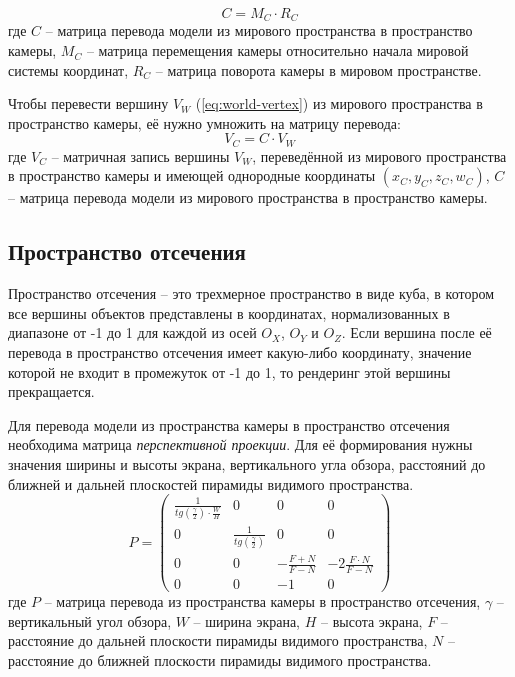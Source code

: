 \begin{equation}
	C = M_C \cdot R_C
\end{equation}
где $C$ -- матрица перевода модели из мирового пространства в пространство камеры, $M_C$ -- матрица перемещения камеры относительно начала мировой системы координат, $R_C$ -- матрица поворота камеры в мировом пространстве.

Чтобы перевести вершину $V_W$ (\ref{eq:world-vertex}) из мирового пространства в пространство камеры, её нужно умножить на матрицу перевода:
\begin{equation}
	V_C = C \cdot V_W
	\label{eq:camera-vertex}
\end{equation}
где $V_C$ -- матричная запись вершины $V_W$, переведённой из мирового пространства в пространство камеры и имеющей однородные координаты $(x_C, y_C, z_C, w_C)$, $C$ -- матрица перевода модели из мирового пространства в пространство камеры. 

\subsection{Пространство отсечения}

Пространство отсечения -- это трехмерное пространство в виде куба, в котором все вершины объектов представлены в координатах, нормализованных в диапазоне от -1 до 1 для каждой из осей $O_X$, $O_Y$ и $O_Z$. Если вершина после её перевода в пространство отсечения имеет какую-либо координату, значение которой не входит в промежуток от -1 до 1, то рендеринг этой вершины прекращается.

Для перевода модели из пространства камеры в пространство отсечения необходима матрица \textit{перспективной проекции}. Для её формирования нужны значения ширины и высоты экрана, вертикального угла обзора, расстояний до ближней и дальней плоскостей пирамиды видимого пространства.
\begin{equation}
	P = 
	\begin{pmatrix}
		\frac{1}{tg(\frac{\gamma}{2}) \cdot \frac{W}{H}} & 0 & 0 & 0 \\
		0 & \frac{1}{tg(\frac{\gamma}{2})} & 0 & 0 \\
		0 & 0 & -\frac{F + N}{F - N} & -2\frac{F \cdot N}{F - N} \\
		0 & 0 & -1 & 0 
	\end{pmatrix}
	\label{eq:clip-matrix}
\end{equation}
где $P$ -- матрица перевода из пространства камеры в пространство отсечения, $\gamma$ -- вертикальный угол обзора, $W$ -- ширина экрана, $H$ -- высота экрана, $F$ -- расстояние до дальней плоскости пирамиды видимого пространства, $N$ -- расстояние до ближней плоскости пирамиды видимого пространства.

